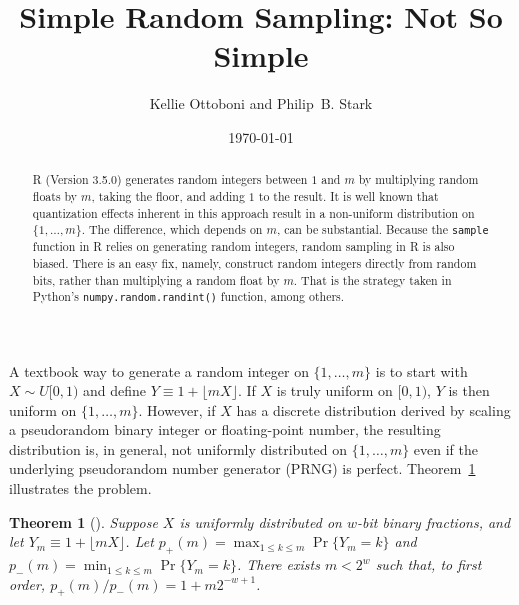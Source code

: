 \documentclass[12pt]{article}
\title{Simple Random Sampling: Not So Simple}
\author{Kellie Ottoboni and Philip~B. Stark}
\date{\today}
\newtheorem{theorem}{Theorem}[section]
\begin{document}
\maketitle


\begin{abstract}
R (Version 3.5.0) generates random integers between $1$ and $m$
by multiplying random floats by $m$, taking the floor, and adding $1$ to the result.
It is well known that quantization effects inherent in this approach result in a 
non-uniform distribution on $\{ 1, \ldots, m\}$.
The difference, which depends on $m$, can be substantial.
Because the \texttt{sample} function in R relies on generating random integers,
random sampling in R is also biased.
There is an easy fix, namely, construct random integers directly from random bits, rather than
multiplying a random float by $m$.
That is the strategy taken in Python's \texttt{numpy.random.randint()} function, among
others.
\end{abstract}



A textbook way to generate a random integer on 
$\{1, \dots, m\}$ is to start with $X \sim U[0,1)$ and define $Y \equiv 1 + \lfloor mX \rfloor$. 
If $X$ is truly uniform on $[0,1)$, $Y$ is then uniform on $\{1, \dots, m\}$.
However, if $X$ has a discrete distribution derived by scaling a pseudorandom binary integer
or floating-point number, 
the resulting distribution is, in general, not uniformly distributed on 
$\{1, \ldots, m \}$ even if the underlying pseudorandom number generator 
(PRNG) is perfect.
Theorem~\ref{thm:theorem_1} illustrates the problem.

\begin{theorem}[\citet{knuth_art_1997}] %
\label{thm:theorem_1}
Suppose $X$ is uniformly distributed on $w$-bit binary fractions, and
let $Y_m \equiv 1 + \lfloor mX \rfloor$.
Let $p_+(m) = \max_{1 \le k \le m} \Pr\{Y_m = k\}$ and $p_-(m) = \min_{1 \le k \le m} \Pr\{Y_m = k\}$.
There exists $m < 2^w$ such that, to first order, 
$p_+(m)/p_-(m) = 1 + m2^{-w+1}$.
\end{theorem}
\end{document}
